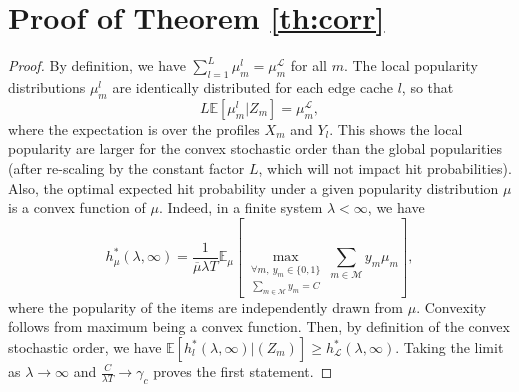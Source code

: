\documentclass[10pt, conference, letterpaper]{IEEEtran}
\newcommand{\mean}[1]{\mathbb{E}\!\left[#1\right]}
\def\EE{\mathbb{E}}
\begin{document}
\section{Proof of Theorem \ref{th:corr}}\label{app:c}
\begin{proof}
By definition, we have $\sum_{l=1}^L\mu_m^l=\mu_m^\mathcal L$ for all $m$. The local popularity distributions $\mu_m^l$ are identically distributed for each edge cache $l$, so that $$L\mean{\mu_m^l\big|Z_m}=\mu_m^\mathcal L,$$
where the expectation is over the profiles $X_m$ and $Y_l$. This shows the local popularity are larger for the convex stochastic order than the global popularities (after re-scaling by the constant factor $L$, which will not impact hit probabilities). Also, the optimal expected hit probability under a given popularity distribution $\mu$ is a convex function of $\mu$. Indeed, in a finite system $\lambda<\infty$, we have 
\[
h^*_\mu(\lambda,\infty)=\frac{1}{\overline\mu\lambda T}\EE_\mu\left[\max_{\substack{\forall m,\:y_m\in \{0,1\}\\\sum_{m\in\mathcal{M}}y_m=C}}\sum_{m\in\mathcal{M}}y_m\mu_m\right],
\]
where the popularity of the items are independently drawn from $\mu$. Convexity follows from maximum being a convex function. Then, by definition of the convex stochastic order, we have $\mean{h^*_l(\lambda,\infty)\big|(Z_m)}\geq h^*_\mathcal L(\lambda,\infty)$. Taking the limit as $\lambda\to\infty$ and $\frac{C}{\lambda T}\to\gamma_c$ proves the first statement.


\end{proof}
\end{document}
